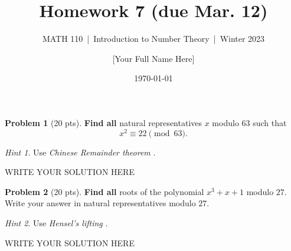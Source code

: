 \documentclass[11pt]{article}
\title{Homework 7 (due Mar. 12)}
\author{[Your Full Name Here]}
\subtitle{MATH 110~|~Introduction to Number Theory~|~Winter 2023}
\date{\today}
\theoremstyle{plain}
\theoremstyle{definition}
\newtheorem{problem}{Problem}
\theoremstyle{remark}
\newtheorem*{hint}{Hint}
\numberwithin{equation}{problem}
\begin{document}
\maketitle

\begin{problem}[20 pts]
	\textbf{Find all} natural representatives $x$ modulo $63$ such that \[x^2\equiv 22\pmod{63}.\]
\end{problem}
\begin{hint}
	Use \emph{Chinese Remainder theorem} \cite[Lecture 19]{LecNote}.
\end{hint}
\begin{solution} %
WRITE YOUR SOLUTION HERE
\end{solution}\clearpage %


\begin{problem}[20 pts]
	\textbf{Find all} roots of the polynomial $x^3+x+1$ modulo $27$. Write your answer in natural representatives modulo $27$.
\end{problem}
\begin{hint}
	Use \emph{Hensel's lifting} \cite[Lecture 20]{LecNote}.
\end{hint}
\begin{solution} %
WRITE YOUR SOLUTION HERE
\end{solution}\clearpage %
\end{document}
